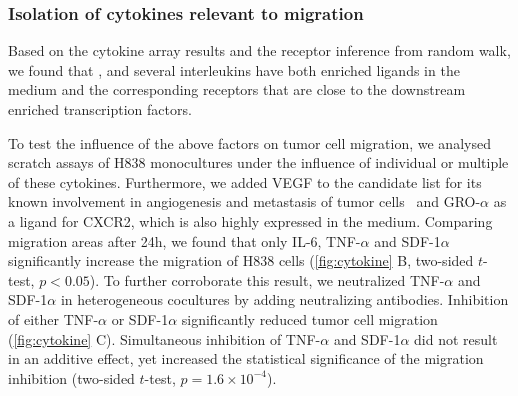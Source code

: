 \subsubsection{Isolation of cytokines relevant to migration}

Based on the cytokine array results and the receptor inference from random walk, 
we found that 
\tnfa, \sdfonea and several interleukins have both enriched ligands in the medium and
the corresponding receptors that are close to the downstream enriched 
transcription factors.

To test the influence of the above factors on tumor cell migration,
we analysed scratch assays of H838 monocultures under the influence of 
individual or multiple of these cytokines. 
Furthermore, we added VEGF to the candidate list for its known involvement in
angiogenesis and metastasis of tumor cells~\citep{Ferrara2003,Hiratsuka2002} and GRO-$\alpha$ as a ligand for CXCR2, which is also highly expressed in the medium.
Comparing migration areas after 24h, 
we found that only IL-6, TNF-$\alpha$ and SDF-1$\alpha$ significantly 
increase the migration of H838 cells (\ref{fig:cytokine} B, two-sided $t$-test,
$p < 0.05$). 
To further corroborate this result, we neutralized 
TNF-$\alpha$ and SDF-1$\alpha$ in heterogeneous cocultures  by adding neutralizing antibodies.
Inhibition of  either TNF-$\alpha$ or SDF-1$\alpha$ significantly reduced tumor cell migration (\ref{fig:cytokine} C). 
Simultaneous inhibition of TNF-$\alpha$ and SDF-1$\alpha$ did not result in an additive effect, yet increased the statistical significance of the migration 
inhibition
(two-sided $t$-test, $p=1.6\times10^{-4}$).

